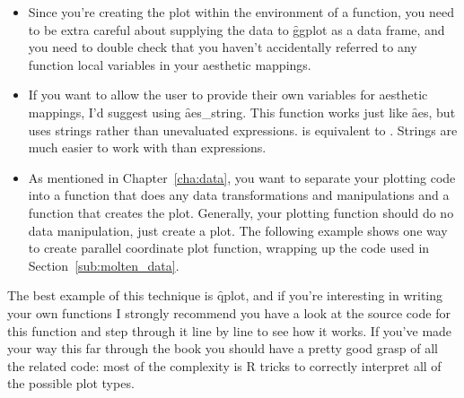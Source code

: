 \begin{itemize}
  \item Since you're creating the plot within the environment of a function, you need to be extra careful about supplying the data to \f{ggplot} as a data frame, and you need to double check that you haven't accidentally referred to any function local variables in your aesthetic mappings.
  
  \item If you want to allow the user to provide their own variables for aesthetic mappings, I'd suggest using \f{aes_string}.  This function works just like \f{aes}, but uses strings rather than unevaluated expressions.  is equivalent to .  Strings are much easier to work with than expressions.

  \item As mentioned in Chapter~\ref{cha:data}, you want to separate your plotting code into a function that does any data transformations and manipulations and a function that creates the plot. Generally, your plotting function should do no data manipulation, just create a plot. The following example shows one way to create parallel coordinate plot function, wrapping up the code used in Section~\ref{sub:molten_data}.

    
  
\end{itemize}

The best example of this technique is \f{qplot}, and if you're interesting in writing your own functions I strongly recommend you have a look at the source code for this function and step through it line by line to see how it works.  If you've made your way this far through the book you should have a pretty good grasp of all the \ggplot related code: most of the complexity is R tricks to correctly interpret all of the possible plot types.


